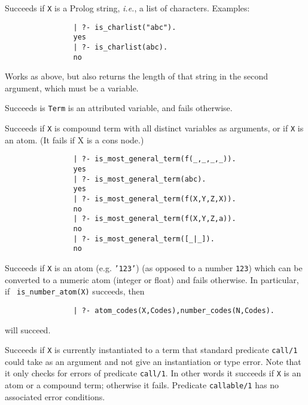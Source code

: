 \begin{description}
    Succeeds if {\tt X} is a Prolog string, {\it i.e.}, a list of
    characters.
    Examples:
    {\footnotesize
     \begin{verbatim}
                | ?- is_charlist("abc").
                yes
                | ?- is_charlist(abc).
                no
     \end{verbatim}}

    Works as above, but also returns the length of that string in the second
    argument, which must be a variable.

    Succeeds is {\tt Term} is an attributed variable, and fails otherwise.

    Succeeds if {\tt X} is compound term with all distinct variables
as arguments, or if {\tt X} is an atom. (It fails if X is a cons node.)
    {\footnotesize
     \begin{verbatim}
                | ?- is_most_general_term(f(_,_,_,_)).
                yes
                | ?- is_most_general_term(abc).
                yes
                | ?- is_most_general_term(f(X,Y,Z,X)).
                no
                | ?- is_most_general_term(f(X,Y,Z,a)).
                no
                | ?- is_most_general_term([_|_]).
                no
     \end{verbatim}}


    Succeeds if {\tt X} is an atom (e.g. {\tt '123'}) (as opposed to a
    number {\tt 123}) which can be converted to a numeric atom
    (integer or float) and fails otherwise.  In particular, if {\tt
      is\_number\_atom(X)} succeeds, then {\footnotesize
     \begin{verbatim}
                | ?- atom_codes(X,Codes),number_codes(N,Codes).
     \end{verbatim}}
    will succeed.

    Succeeds if {\tt X} is currently instantiated to a term that standard
    predicate {\tt call/1} could take as an argument and not give an 
    instantiation or type error.  Note that it only checks for errors of
    predicate {\tt call/1}.  In other words it succeeds if {\tt X}
    is an atom or a compound term; otherwise it fails.  Predicate
    {\tt callable/1} has no associated error conditions.


\end{description}
